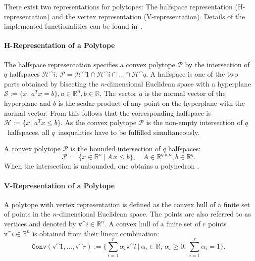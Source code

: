  \label{sec:polytopes}

There exist two representations for polytopes: The halfspace representation (H-representation) and the vertex representation (V-representation).
Details of the implemented functionalities can be found in~\cite{Wetzlinger2024a}.

\paragraph{H-Representation of a Polytope}
The halfspace representation specifies a convex polytope $\mathcal{P}$ by the intersection of $q$ halfspaces $\mathcal{H}\^{i}$: $\mathcal{P}=\mathcal{H}\^{1} \cap \mathcal{H}\^{i} \cap \ldots \cap \mathcal{H}\^{q}$. A halfspace is one of the two parts obtained by bisecting the $n$-dimensional Euclidean space with a hyperplane $\mathcal{S}:=\{x \, | \, a^T x = b\}, a \in\mathbb{R}^{n},b\in\mathbb{R}$. The vector $a$ is the normal vector of the hyperplane and $b$ is the scalar product of any point on the hyperplane with the normal vector. From this follows that the corresponding halfspace is $\mathcal{H}:=\{x \, | \, a^T x\leq b\}$. As the convex polytope $\mathcal{P}$ is the non-empty intersection of $q$~halfspaces, all $q$~inequalities have to be fulfilled simultaneously.

A convex polytope $\mathcal{P}$ is the bounded intersection of $q$ halfspaces:
\begin{equation}
  \mathcal{P}:=\Big\{x \in \mathbb{R}^n ~\big|~ A\, x\leq b \Big\}, \quad A\in\mathbb{R}^{q\times n}, b\in\mathbb{R}^{q}.
  \label{eq:polytopeHalfspace}
\end{equation}
When the intersection is unbounded, one obtains a polyhedron \cite{Ziegler1995}.

\paragraph{V-Representation of a Polytope}
A polytope with vertex representation is defined as the convex hull of a finite set of points in the $n$-dimensional Euclidean space. The points are also referred to as vertices and denoted by $\mathtt{v}\^i\in\mathbb{R}^n$. A convex hull of a finite set of $r$ points $\mathtt{v}\^i\in\mathbb{R}^n$ is obtained from their linear combination:
\begin{equation}
\mathtt{Conv}(\mathtt{v}\^1,\ldots,\mathtt{v}\^r):=\Big\{\sum_{i=1}^{r} \alpha_i \mathtt{v}\^i ~\big|~ \alpha_i \in\mathbb{R}, \, \alpha_i\geq 0, \, \sum_{i=1}^{r} \alpha_i=1 \Big\}.
	\label{eq:polytopeVertex}
\end{equation}


